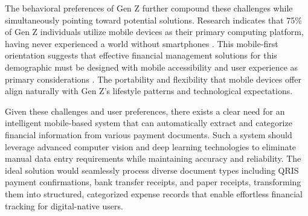 The behavioral preferences of Gen Z further compound these challenges while simultaneously pointing toward potential solutions. Research indicates that 75\% of Gen Z individuals utilize mobile devices as their primary computing platform, having never experienced a world without smartphones \cite{Campfire2024GenZ}. This mobile-first orientation suggests that effective financial management solutions for this demographic must be designed with mobile accessibility and user experience as primary considerations \cite{wandhe2024new}. The portability and flexibility that mobile devices offer align naturally with Gen Z's lifestyle patterns and technological expectations.

Given these challenges and user preferences, there exists a clear need for an intelligent mobile-based system that can automatically extract and categorize financial information from various payment documents. Such a system should leverage advanced computer vision and deep learning technologies to eliminate manual data entry requirements while maintaining accuracy and reliability. The ideal solution would seamlessly process diverse document types including QRIS payment confirmations, bank transfer receipts, and paper receipts, transforming them into structured, categorized expense records that enable effortless financial tracking for digital-native users.